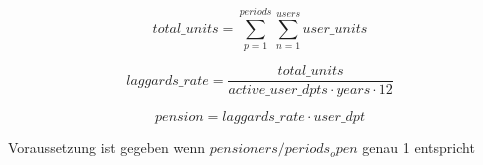 \begin{equation*}
	total\_units = 	
	\sum_{p=1}^{periods} \sum_{n=1}^{users} user\_units	
\end{equation*}

\begin{equation*}
	laggards\_rate = 	
	\frac{total\_units} 
	{active\_user\_dpts \cdot years \cdot 12}		
\end{equation*}

\begin{equation*}
	pension = laggards\_rate \cdot user\_dpt
\end{equation*}


Voraussetzung ist gegeben wenn $pensioners / periods_open$ genau 1 entspricht
